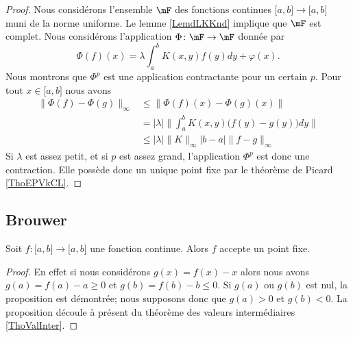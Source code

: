 \begin{proof}
    Nous considérons l'ensemble \( \mF\) des fonctions continues \( \mathopen[ a , b \mathclose]\to\mathopen[ a , b \mathclose]\) muni de la norme uniforme. Le lemme \ref{LemdLKKnd} implique que \( \mF\) est complet. Nous considérons l'application \( \Phi\colon \mF\to \mF\) donnée par
    \begin{equation}
        \Phi(f)(x)=\lambda\int_a^bK(x,y)f(y)dy+\varphi(x). 
    \end{equation}
    Nous montrons que \( \Phi^p\) est une application contractante pour un certain \( p\). Pour tout \( x\in \mathopen[ a , b \mathclose]\) nous avons
    \begin{subequations}
        \begin{align}
            \| \Phi(f)-\Phi(g) \|_{\infty}&\leq \| \Phi(f)(x)-\Phi(g)(x) \|\\
            &=| \lambda |\Big\| \int_a^bK(x,y)\big( f(y)-g(y) \big)dy  \Big\|\\
            &\leq | \lambda |\| K \|_{\infty}| b-a |\| f-g \|_{\infty}
        \end{align}
    \end{subequations}
    Si \( \lambda\) est assez petit, et si \( p\) est assez grand, l'application \( \Phi^p\) est donc une contraction. Elle possède donc un unique point fixe par le théorème de Picard \ref{ThoEPVkCL}.
\end{proof}

\subsection{Brouwer}
\label{subSecZCCmMnQ}

\begin{proposition}
    Soit \( f\colon \mathopen[ a , b \mathclose]\to \mathopen[ a , b \mathclose]\) une fonction continue. Alors \( f\) accepte un point fixe.
\end{proposition}

\begin{proof}
    En effet si nous considérons \( g(x)=f(x)-x\) alors nous avons \( g(a)=f(a)-a\geq 0\) et \( g(b)=f(b)-b\leq 0\). Si \( g(a)\) ou \( g(b)\) est nul, la proposition est démontrée; nous supposons donc que \( g(a)>0\) et \( g(b)<0\). La proposition découle à présent du théorème des valeurs intermédiaires \ref{ThoValInter}.
\end{proof}

